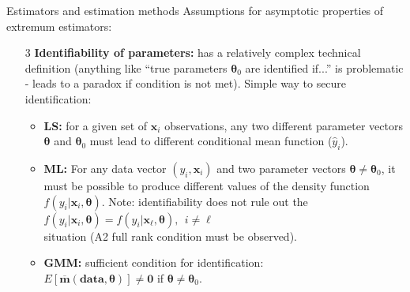 \documentclass{beamer}
\begin{document}
\begin{frame}{Estimators and estimation methods}
Assumptions for asymptotic properties of extremum estimators:
\medskip
\begin{itemize}
    \item[3] \textbf{Identifiability of parameters:} has a relatively complex technical definition (anything like ``true parameters $\bm{\theta}_0$ are identified if...'' is problematic - leads to a paradox if condition is not met). Simple way to secure identification:
    \medskip
    \begin{itemize}
        \item \textbf{LS:} for a given set of $\bm{x}_i$ observations, any two different parameter vectors $\bm{\theta}$ and $\bm{\theta}_0$ must lead to different conditional mean function ($\hat{y}_i$).
        \smallskip
        \item \textbf{ML:} For any data vector $(y_i, \bm{x}_i)$ and two parameter vectors $\bm{\theta} \neq \bm{\theta}_0$, it must be possible to produce different values of the density function $f(y_i|\bm{x}_i,\bm{\theta})$. Note: identifiability does not rule out the  $f(y_i|\bm{x}_i,\bm{\theta}) = f(y_i|\bm{x}_{\ell},\bm{\theta}), ~~i \neq \ell$ \\situation (A2 full rank condition must be observed).
        \smallskip
        \item \textbf{GMM:} sufficient condition for identification:\\ $E[\overline{\bm{m}}(\textbf{data},\bm{\theta})] \neq \bm{0}$ if $\bm{\theta} \neq \bm{\theta}_0$.
    \end{itemize}
\end{itemize}
\end{frame}
\end{document}
